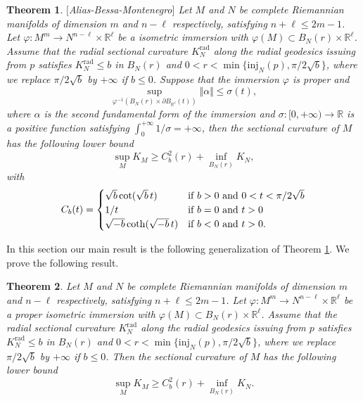 \documentclass[a4paper]{amsart}
\newtheorem{theorem}{Theorem}
\begin{document}
\begin{theorem}
\label{1thmMain}$[$Alias-Bessa-Montenegro$]$
Let $M$ and $N$  be complete Riemannian manifolds of dimension $m$ and $n-\ell$ respectively, satisfying
$n+\ell\leq 2m-1$. Let $\varphi:M^m\rightarrow N^{n-\ell}\times{\mathbb{R}}^{\ell}$ be a isometric immersion with  $\varphi(M)\subset B_N(r)\times{\mathbb{R}}^{\ell}$.
Assume that the radial sectional curvature $K_N^{\mathrm{rad}}$ along the radial geodesics issuing from $p$
satisfies $K_N^{\mathrm{rad}}\leq b$ in $B_N(r)$ and $0<r<\min\{\mathrm{inj}_N(p),\pi/2\sqrt{b}\}$, where we replace
$\pi/2\sqrt{b}$ by $+\infty$ if $b\leq 0$. Suppose that the immersion $\varphi $ is proper and
\begin{equation}
\sup_{\varphi^{-1}(B_{N}(r)\times \partial B_{\mathbb{R}^{\ell}}(t))}\Vert\alpha\Vert\leq \sigma(t),
\label{growth}
\end{equation}
where $\alpha$ is the second fundamental form of the immersion and $\sigma:[0,+\infty)\rightarrow\mathbb{R}$ is a
positive  function satisfying $\int_0^{+\infty}1/\sigma=+\infty$, then the sectional curvature of $M$ has the following lower bound
\begin{equation}
\sup_{M}K_{M}\geq C_{b}^{2}(r)+\inf_{B_{N}(r)}K_{N},
\label{eq-ABM}
\end{equation} with
\[
C_b(t)=
\begin{cases}
\sqrt{b}\cot(\sqrt{b}\,t) & \mbox{\rm if $b>0$ and $0<t<\pi/2\sqrt{b}$}\\
1/t & \mbox{\rm if $b=0$ and $t>0$}\\
\sqrt{-b}\coth(\sqrt{-b}\,t) & \mbox{\rm if $b<0$ and $t>0$}.
\end{cases}
\]
\end{theorem}In this section our main result is the following generalization of Theorem \ref{1thmMain}. We prove the following result.
\begin{theorem}\label{thmMain}
Let $M$ and $N$  be complete Riemannian manifolds of dimension $m$ and $n-\ell$ respectively, satisfying
$n+\ell\leq 2m-1$. Let $\varphi:M^m\rightarrow N^{n-\ell}\times{\mathbb{R}}^{\ell}$ be a proper isometric immersion with  $\varphi(M)\subset B_N(r)\times{\mathbb{R}}^{\ell}$.
Assume that the radial sectional curvature $K_N^{\mathrm{rad}}$ along the radial geodesics issuing from $p$
satisfies $K_N^{\mathrm{rad}}\leq b$ in $B_N(r)$ and $0<r<\min\{\mathrm{inj}_N(p),\pi/2\sqrt{b}\}$, where we replace
$\pi/2\sqrt{b}$ by $+\infty$ if $b\leq 0$.
 Then the sectional curvature of $M$ has the following lower bound
\begin{equation}
\sup_{M}K_{M}\geq C_{b}^{2}(r)+\inf_{B_{N}(r)}K_{N}.
\label{eq-ABM}
\end{equation}
\end{theorem}
\end{document}
